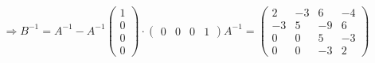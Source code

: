 \documentclass[a4paper]{article}
\theoremstyle{definition}
\begin{document}
\[ \Rightarrow B^{-1} = A^{-1} - A^{-1} \begin{pmatrix} 1 \\ 0 \\ 0 \\ 0 \end{pmatrix} \cdot \begin{pmatrix} 0 & 0 & 0 & 1 \end{pmatrix} A^{-1}
  = \begin{pmatrix}
    2 & -3 & 6 & -4  \\
    -3 & 5 & -9 & 6 \\
    0 & 0 & 5 & -3 \\
    0 & 0 & -3 & 2
  \end{pmatrix}
\]
\end{document}
